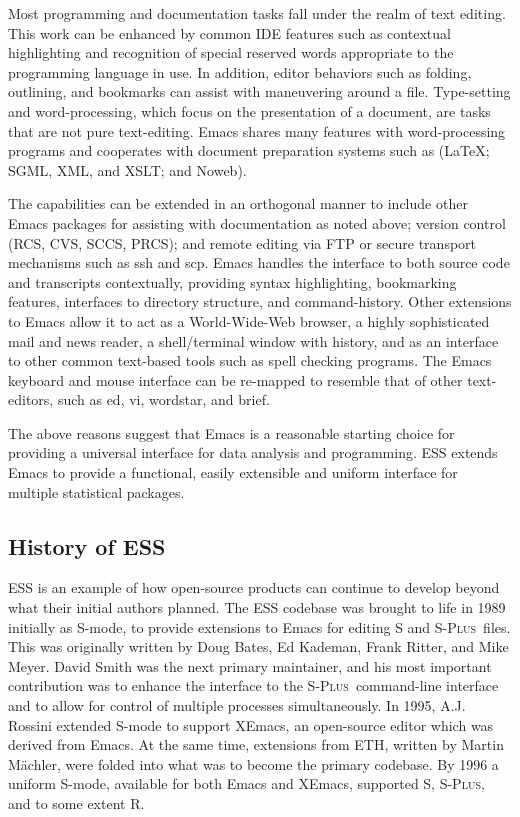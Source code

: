 \documentclass{article}
\newcommand*{\Splus}{\textsc{S-Plus}}
\begin{document}
Most programming and documentation tasks fall under the realm of text
editing.  This work can be enhanced by common IDE features such as
contextual highlighting and recognition of special reserved words
appropriate to the programming language in use.  In addition, editor
behaviors such as folding, outlining, and bookmarks can assist with
maneuvering around a file.  Type-setting and word-processing, which
focus on the presentation of a document, are tasks that are not pure
text-editing.  Emacs shares many features with word-processing
programs and cooperates with document preparation systems such as
(\LaTeX; SGML, XML, and XSLT; and Noweb).

The capabilities can be extended in an orthogonal manner to include
other Emacs packages for assisting with documentation as noted above;
version control (RCS, CVS, SCCS, PRCS); and remote editing via FTP or
secure transport mechanisms such as ssh and scp.  Emacs handles the
interface to both source code and transcripts contextually, providing
syntax highlighting, bookmarking features, interfaces to directory
structure, and command-history.  Other extensions to Emacs allow it to
act as a World-Wide-Web browser, a highly sophisticated mail and news
reader, a shell/terminal window with history, and as an interface to
other common text-based tools such as spell checking programs.  The
Emacs keyboard and mouse interface can be re-mapped to resemble that
of other text-editors, such as ed, vi, wordstar, and brief.

The above reasons suggest that Emacs is a reasonable starting choice
for providing a universal interface for data analysis and programming.
ESS extends Emacs to provide a functional, easily extensible and
uniform interface for multiple statistical packages.

\subsection{History of ESS}
\label{sec:ESS:history}

ESS is an example of how open-source products can continue to develop
beyond what their initial authors planned.  The ESS codebase was
brought to life in 1989 initially as S-mode, to provide extensions to
Emacs for editing S and \Splus\ files.  This was originally written by
Doug Bates, Ed Kademan, Frank Ritter, and Mike Meyer.  David Smith was
the next primary maintainer, and his most important contribution was
to enhance the interface to the \Splus\ command-line interface and to
allow for control of multiple processes simultaneously.  In 1995, A.J.
Rossini extended S-mode to support XEmacs, an open-source editor which
was derived from Emacs.  At the same time, extensions from ETH,
written by Martin M{\"a}chler, were folded into what was to become the
primary codebase.  By 1996 a uniform S-mode, available
for both Emacs and XEmacs, supported S, \Splus, and to some extent R.
\end{document}
